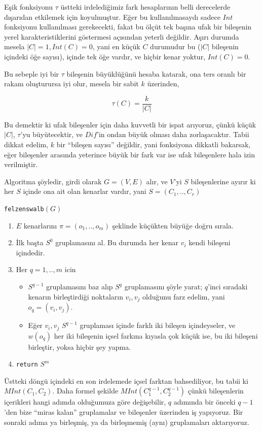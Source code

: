 \documentclass[12pt,fleqn]{article}\usepackage{../../common}
\begin{document}
Eşik fonksiyonu $\tau$ üstteki irdelediğimiz fark hesaplarının belli
derecelerde dışarıdan etkilemek için koyulmuştur. Eğer bu kullanılmasaydı
sadece $Int$ fonksiyonu kullanılması gerekecekti, fakat bu ölçüt tek
başına ufak bir bileşenin yerel karakteristiklerini göstermesi açısından yeterli
değildir. Aşırı durumda mesela $|C| = 1,Int(C)=0$, yani en küçük $C$
durumudur bu ($|C|$ bileşenin içindeki öğe sayısı), içinde tek öğe vardır,
ve hiçbir kenar yoktur, $Int(C) = 0$.  

Bu sebeple iyi bir $\tau$ bileşenin büyüklüğünü hesaba katarak, ona ters
oranlı bir rakam oluşturursa iyi olur, mesela bir sabit $k$ üzerinden,

$$ \tau(C) = \frac{k}{|C|} $$

Bu demektir ki ufak bileşenler için daha kuvvetli bir ispat arıyoruz, çünkü
küçük $|C|$, $\tau$'yu büyütecektir, ve $Dif$'in ondan büyük olması daha
zorlaşacaktır. Tabii dikkat edelim, $k$ bir ``bileşen sayısı'' değildir,
yani fonksiyona dikkatli bakarsak, eğer bileşenler arasında yeterince büyük
bir fark var ise ufak bileşenlere hala izin verilmiştir.

Algoritma şöyledir, girdi olarak $G=(V,E)$ alır, ve $V$'yi $S$
bileşenlerine ayırır ki her $S$ içinde ona ait olan kenarlar vardır, yani
$S=(C_1,..,C_r)$ 

\verb!felzenswalb!$\left(G\right)$
\begin{enumerate}
  \item $E$ kenarlarını $\pi = (o_1,..,o_m)$ şeklinde küçükten büyüğe doğru
    sırala.
  \item İlk başta $S^0$ gruplamasını al. Bu durumda her kenar $v_i$
    kendi bileşeni içindedir.
  \item Her $q = 1,..,m$ icin
  \begin{itemize}
  \item $S^{q-1}$ gruplamasını baz alıp $S^q$ gruplamasını şöyle yarat;
    $q$'inci sıradaki kenarın birleştirdiği noktaların $v_i,v_j$ olduğunu
    farz edelim, yani $o_q = (v_i,v_j)$.
  \item Eğer $v_i,v_j$ $S^{q-1}$ gruplaması içinde farklı iki bileşen
    içindeyseler, ve $w(o_q)$ her iki bileşenin içsel farkına kıyasla çok
    küçük ise, bu iki bileşeni birleştir, yoksa hiçbir şey yapma.
  \end{itemize}
  \item \verb!return! $S^m$ 
\end{enumerate}

Üstteki döngü içindeki en son irdelemede içsel farktan bahsediliyor, bu
tabii ki $MInt(C_1,C_2)$. Daha formel şekilde $MInt(C_1^{q-1},C_2^{q-1})$
çünkü bileşenlerin içerikleri hangi adımda olduğumuza göre değişebilir, $q$
adımında bir önceki $q-1$'den bize ``miras kalan'' gruplamalar ve
bileşenler üzerinden iş yapıyoruz. Bir sonraki adıma ya birleşmiş, ya da
birleşmemiş (aynı) gruplamaları aktarıyoruz. 
\end{document}
